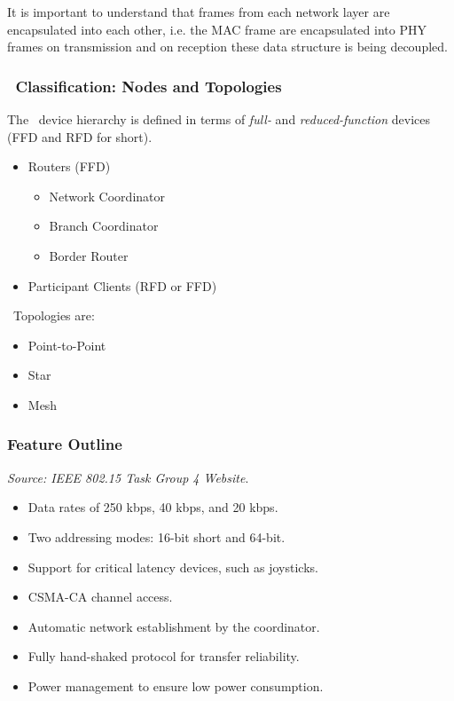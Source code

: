 It is important to understand that frames from each network layer are
encapsulated into each other, i.e. the MAC frame are encapsulated into
PHY frames on transmission and on reception these data structure is
being decoupled.


\subsubsection{\WPAN\ Classification: Nodes and Topologies}

  The \WPAN\ device hierarchy is defined in terms of \emph{full-}
  and \emph{reduced-function} devices (FFD and RFD for short).
  
  \begin{itemize}
 	\item Routers (FFD) 
	\begin{itemize}
		\item Network Coordinator
		\item Branch Coordinator
		\item Border Router
	\end{itemize}
	\item Participant Clients (RFD or FFD)
  \end{itemize}

  \WPAN\ Topologies are:
  \begin{itemize}
  	\item Point-to-Point
	\item Star
	\item Mesh
  \end{itemize}

\subsubsection{Feature Outline}
\emph{Source: IEEE 802.15 Task Group 4 Website}\cite{links:ieee:802:15:4}.

\begin{itemize}
	\item Data rates of 250 kbps, 40 kbps, and 20 kbps.

	\item Two addressing modes: 16-bit short and 64-bit.

	\item Support for critical latency devices, such as joysticks.

	\item CSMA-CA channel access.

	\item Automatic network establishment by the coordinator.

	\item Fully hand-shaked protocol for transfer reliability.

	\item Power management to ensure low power consumption.

\end{itemize}

